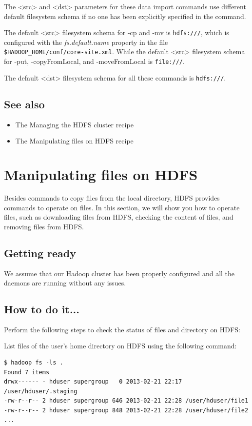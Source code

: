 The <src> and <dst> parameters for these data import commands use different default filesystem schema if no one has been explicitly specified in the command.

The default <src> filesystem schema for -cp and -mv is \verb|hdfs:///|, which is configured with the \emph{fs.default.name} property in the file \verb|$HADOOP_HOME/conf/core-site.xml|. While the default <src> filesystem schema for -put, -copyFromLocal, and -moveFromLocal is \verb|file:///|.

The default <dst> filesystem schema for all these commands is \verb|hdfs:///|.

\subsection*{See also}
  \begin{itemize}
  \item The Managing the HDFS cluster recipe
  \item The Manipulating files on HDFS recipe
\end{itemize}

\section{Manipulating files on HDFS}
Besides commands to copy files from the local directory, HDFS provides commands to operate on files. In this section, we will show you how to operate files, such as downloading files from HDFS, checking the content of files, and removing files from HDFS.
\subsection*{Getting ready}
We assume that our Hadoop cluster has been properly configured and all the daemons are running without any issues.
\subsection*{How to do it...}
Perform the following steps to check the status of files and directory on HDFS:

List files of the user's home directory on HDFS using the following command:
\begin{verbatim}
$ hadoop fs -ls .
Found 7 items
drwx------ - hduser supergroup   0 2013-02-21 22:17 /user/hduser/.staging
-rw-r--r-- 2 hduser supergroup 646 2013-02-21 22:28 /user/hduser/file1
-rw-r--r-- 2 hduser supergroup 848 2013-02-21 22:28 /user/hduser/file2
...
\end{verbatim}

